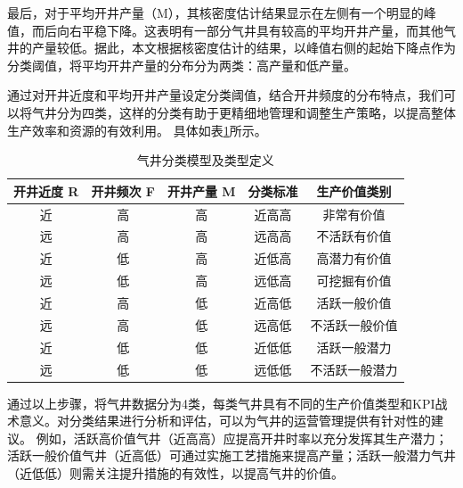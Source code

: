 最后，对于平均开井产量（M），其核密度估计结果显示在左侧有一个明显的峰值，而后向右平稳下降。这表明有一部分气井具有较高的平均开井产量，而其他气井的产量较低。据此，本文根据核密度估计的结果，以峰值右侧的起始下降点作为分类阈值，将平均开井产量的分布分为两类：高产量和低产量。

通过对开井近度和平均开井产量设定分类阈值，结合开井频度的分布特点，我们可以将气井分为四类，这样的分类有助于更精细地管理和调整生产策略，以提高整体生产效率和资源的有效利用。
具体如表\ref{table:KDE}所示。
\begin{table}[H]
    \renewcommand{\arraystretch}{1.5}
    \centering
    \caption{气井分类模型及类型定义}
    \begin{tabular}{|c|c|c|c|c|}
    \hline
    开井近度 R & 开井频次 F & 开井产量 M & 分类标准       & 生产价值类别   \\ \hline
    近       & 高       & 高       & 近高高       & 非常有价值 \\ \hline
    远       & 高       & 高       & 远高高       & 不活跃有价值 \\ \hline
    近       & 低       & 高       & 近低高       & 高潜力有价值 \\ \hline
    远       & 低       & 高       & 远低高       & 可挖掘有价值 \\ \hline
    近       & 高       & 低       & 近高低       & 活跃一般价值 \\ \hline
    远       & 高       & 低       & 远高低       & 不活跃一般价值 \\ \hline
    近       & 低       & 低       & 近低低       & 活跃一般潜力 \\ \hline
    远       & 低       & 低       & 远低低       & 不活跃一般潜力 \\ \hline
    \end{tabular}
    \label{table:KDE}
\end{table}
通过以上步骤，将气井数据分为4类，每类气井具有不同的生产价值类型和KPI战术意义。对分类结果进行分析和评估，可以为气井的运营管理提供有针对性的建议。
例如，活跃高价值气井（近高高）应提高开井时率以充分发挥其生产潜力；活跃一般价值气井（近高低）可通过实施工艺措施来提高产量；活跃一般潜力气井（近低低）则需关注提升措施的有效性，以提高气井的价值。  
